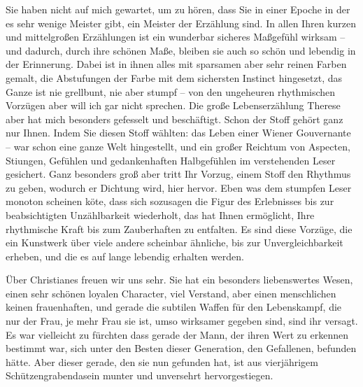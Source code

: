 \pstart
           Sie haben nicht auf mich gewartet, um zu hören, dass Sie in einer Epoche in der es
               sehr wenige Meister gibt, ein Meister der Erzählung sind. In allen Ihren kurzen und
               mittelgroßen Erzählungen ist ein wunderbar sicheres Maßgefühl wirksam – und dadurch,
               durch ihre schönen Maße, bleiben sie auch so schön und lebendig in der Erinnerung.
                  {\pb}Dabei ist in ihnen alles mit
               sparsamen aber sehr reinen Farben gemalt, die Abstufungen der Farbe mit dem
               sichersten Instinct hingesetzt, das Ganze ist nie grellbunt, nie aber stumpf – von
               den ungeheuren rhythmischen Vorzügen aber will ich gar nicht sprechen. Die große
               Lebenserzählung Therese aber hat mich besonders
               gefesselt und beschäftigt. Schon der Stoff gehört ganz nur Ihnen. Indem Sie diesen
               Stoff wählten: das Leben einer Wiener Gouvernante
               – war schon eine ganze Welt hingestellt, und ein großer Reichtum von Aspecten, Sti{\geminationm}ungen, Gefühlen und gedankenhaften Halbgefühlen im
               verstehenden Leser gesichert. Ganz besonders groß aber tritt Ihr Vorzug, einem Stoff
               den Rhythmus zu geben, wodurch er Dichtung wird, hier hervor. Eben was dem stumpfen
               Leser monoton scheinen kö{\geminationn}te, dass sich sozusagen die
               Figur des Erlebnisses bis zur beabsichtigten Unzählbarkeit wiederholt, das hat Ihnen
               ermöglicht, Ihre rhythmische Kraft bis zum Zauberhaften zu entfalten. Es sind diese
               Vorzüge, die ein Kunstwerk über viele andere scheinbar ähnliche, bis zur
               Unvergleichbarkeit erheben, und die {\pb}es auf lange lebendig erhalten
               werden.\pend
           
\pstart
           Über Christianes\label{K_L02503-3v}\label{K_L02503-3} freuen wir uns sehr. Sie
               hat ein besonders liebenswertes Wesen, einen sehr schönen loyalen Character, viel
               Verstand, aber einen menschlichen keinen frauenhaften, und gerade die subtilen Waffen
               für den Lebenskampf, die nur der Frau, je mehr Frau sie ist, umso wirksamer gegeben
               sind, sind ihr versagt. Es war vielleicht zu fürchten dass gerade der Mann, der ihren
               Wert zu erkennen bestimmt war, sich unter den Besten dieser Generation, den
               Gefallenen, befunden hätte. Aber dieser gerade, den sie nun gefunden hat, ist aus vierjährigem
               Schützengrabendasein munter und unversehrt hervorgestiegen.\pend
           
